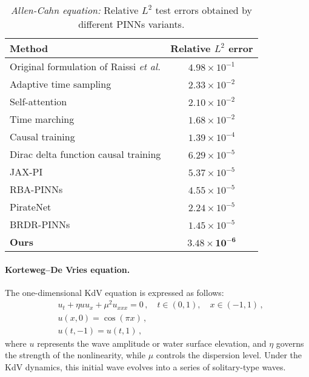 \begin{table}
    \renewcommand{\arraystretch}{1.4}
    \centering
    \caption{{\em Allen-Cahn equation:} Relative $L^2$ test errors obtained by different PINNs variants.}
    \label{tab: AC}
    \begin{tabular}{l|c}
    \hline
    \textbf{Method}   & \textbf{Relative $L^2$ error}  \\
     \hline
      Original formulation of Raissi {\it et al.} \cite{raissi2019physics}    &  $4.98 \times 10^{-1}$ \\
      Adaptive time sampling \cite{wight2020solving} & $2.33 \times 10^{-2}$ \\
       Self-attention \cite{mcclenny2020self} & $2.10 \times 10^{-2}$  \\
       Time marching \cite{mattey2022novel}  & $1.68 \times 10^{-2}$ \\
       Causal training \cite{wang2022respecting} & $1.39 \times 10^{-4}$ \\
       Dirac delta function causal training \cite{es2023optimal}  & $6.29  \times 10^{-5}$ \\
       JAX-PI \cite{wang2023expert} & $5.37 \times 10^{-5}$ \\
        RBA-PINNs  \cite{anagnostopoulos2023residual}  & $4.55 \times 10^{-5}$ \\
    PirateNet \cite{wang2024piratenets} & ${2.24 \times 10^{-5}}$ \\
         BRDR-PINNs  \cite{chen2024self}  & $1.45 \times 10^{-5}$ \\
        \textbf{Ours} & $\mathbf{3.48 \times 10^{-6}}$ \\
    \hline
    \end{tabular}

\end{table}


\paragraph{Korteweg–De Vries equation.} The one-dimensional KdV equation is expressed as follows:
\begin{align*}
& u_t + \eta u u_x + \mu^2 u_{x x x} = 0\,, \quad t \in(0,1), \quad x \in(-1,1)\,, \\
& u(x, 0) = \cos (\pi x)\,, \\
& u(t,-1) = u(t, 1)\,,
\end{align*}
where $u$ represents the wave amplitude or water surface elevation, and $\eta$ governs the strength of the nonlinearity, while $\mu$ controls the dispersion level. Under the KdV dynamics,  this initial wave evolves into a series of solitary-type waves.

